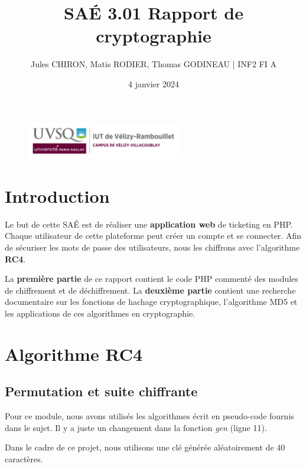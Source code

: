 \documentclass[12pt, a4paper]{article}
\title{SAÉ 3.01 Rapport de cryptographie}
\author{Jules CHIRON, Matis RODIER, Thomas GODINEAU | INF2 FI A}
\date{4 janvier 2024}
\begin{document}
\maketitle

\begin{figure}[h]
    \includegraphics[width=0.6\textwidth]{../annexes/logo_uvsq}
\end{figure}

\tableofcontents{}
\section*{Introduction}

Le but de cette SAÉ est de réaliser une \textbf{application web} de ticketing en PHP.\@
Chaque utilisateur de cette plateforme peut créer un compte et se connecter.
Afin de sécuriser les mots de passe des utilisateurs, nous les chiffrons avec l'algorithme \textbf{RC4}.
\bigskip

La \textbf{première partie} de ce rapport contient le code PHP commenté des modules de chiffrement et de déchiffrement.
La \textbf{deuxième partie} contient une recherche documentaire sur les fonctions de hachage cryptographique,
l'algorithme MD5 et les applications de ces algorithmes en cryptographie.

\section{Algorithme RC4}

\subsection{Permutation et suite chiffrante}

Pour ce module,
nous avons utilisés les algorithmes écrit en pseudo-code fournis dans le sujet.
Il y a juste un changement dans la fonction \textit{gen} (ligne 11).

\noindent Dans le cadre de ce projet, nous utilisons une clé générée aléatoirement de 40 caractères.

\end{document}
